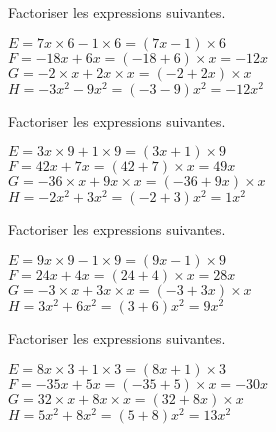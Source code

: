 \documentclass[a4paper,11pt,fleqn]{article}		%
\begin{document}
\begin{correction}
\begin{multicols}{2}
Factoriser les expressions suivantes.

$E=  7x \times 6   -1 \times  6 =   (7  x  -1 ) \times 6 $\\
$F=  -18  x  +6  x=  (-18   +6 ) \times  x=  -12  x$\\
$G=  -2 \times  x  +2 x\times x=  (-2   +2 x) \times  x$\\
$H=  -3 x^2  -9 x^2=  (-3 -9) x^2=  -12 x^2$

Factoriser les expressions suivantes.

$E=  3x \times 9   +1 \times  9 =   (3  x  +1 ) \times 9 $\\
$F=  42  x  +7  x=  (42   +7 ) \times  x=  49  x$\\
$G=  -36 \times  x  +9 x\times x=  (-36   +9 x) \times  x$\\
$H=  -2 x^2  +3 x^2=  (-2 +3) x^2=  1 x^2$

Factoriser les expressions suivantes.

$E=  9x \times 9   -1 \times  9 =   (9  x  -1 ) \times 9 $\\
$F=  24  x  +4  x=  (24   +4 ) \times  x=  28  x$\\
$G=  -3 \times  x  +3 x\times x=  (-3   +3 x) \times  x$\\
$H=  3 x^2  +6 x^2=  (3 +6) x^2=  9 x^2$

Factoriser les expressions suivantes.

$E=  8x \times 3   +1 \times  3 =   (8  x  +1 ) \times 3 $\\
$F=  -35  x  +5  x=  (-35   +5 ) \times  x=  -30  x$\\
$G=  32 \times  x  +8 x\times x=  (32   +8 x) \times  x$\\
$H=  5 x^2  +8 x^2=  (5 +8) x^2=  13 x^2$
\end{multicols}

\exon{}


\end{correction}
\end{document}
